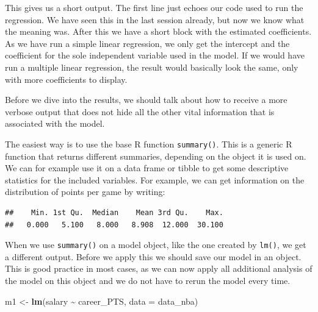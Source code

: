 \documentclass[
]{book}
\newenvironment{Shaded}{\begin{snugshade}}{\end{snugshade}}
\newcommand{\AttributeTok}[1]{\textcolor[rgb]{0.13,0.29,0.53}{#1}}
\newcommand{\FunctionTok}[1]{\textcolor[rgb]{0.13,0.29,0.53}{\textbf{#1}}}
\newcommand{\NormalTok}[1]{#1}
\newcommand{\OtherTok}[1]{\textcolor[rgb]{0.56,0.35,0.01}{#1}}
\newcommand{\SpecialCharTok}[1]{\textcolor[rgb]{0.81,0.36,0.00}{\textbf{#1}}}
\begin{document}
This gives us a short output. The first line just echoes our code used
to run the regression. We have seen this in the last session already,
but now we know what the meaning was. After this we have a short block
with the estimated coefficients. As we have run a simple linear
regression, we only get the intercept and the coefficient for the sole
independent variable used in the model. If we would have run a multiple
linear regression, the result would basically look the same, only with
more coefficients to display.

Before we dive into the results, we should talk about how to receive a
more verbose output that does not hide all the other vital information
that is associated with the model.

The easiest way is to use the base R function \texttt{summary()}. This is a
generic R function that returns different summaries, depending on the
object it is used on. We can for example use it on a data frame or
tibble to get some descriptive statistics for the included variables.
For example, we can get information on the distribution of points per
game by writing:

\begin{Shaded}
\end{Shaded}

\begin{verbatim}
##    Min. 1st Qu.  Median    Mean 3rd Qu.    Max. 
##   0.000   5.100   8.000   8.908  12.000  30.100
\end{verbatim}

When we use \texttt{summary()} on a model object, like the one created by
\texttt{lm()}, we get a different output. Before we apply this we should save
our model in an object. This is good practice in most cases, as we can
now apply all additional analysis of the model on this object and we do
not have to rerun the model every time.

\begin{Shaded}
\begin{Highlighting}[]
\NormalTok{m1 }\OtherTok{\textless{}{-}} \FunctionTok{lm}\NormalTok{(salary }\SpecialCharTok{\textasciitilde{}}\NormalTok{ career\_PTS, }\AttributeTok{data =}\NormalTok{ data\_nba)}
\end{Highlighting}
\end{Shaded}
\end{document}
